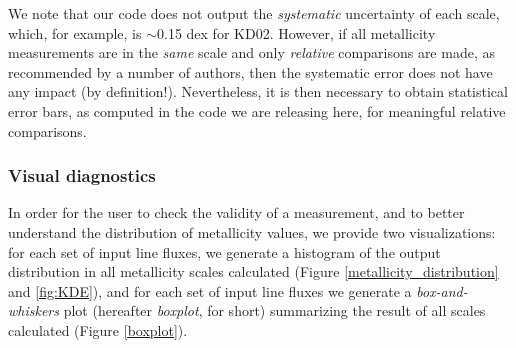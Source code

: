 \documentclass{emulateapj}
\begin{document}
We note that our code does not output the \emph{systematic} uncertainty of each scale, which, for example, is $\sim$0.15 \nolinebreak dex  for KD02. However, if all metallicity measurements are in the \emph{same} scale and only \emph{relative} comparisons are made, as recommended by a number of authors, then the systematic error does not have any impact (by definition!). Nevertheless, it is then necessary to obtain statistical error bars, as computed in the code we are releasing here, for meaningful relative comparisons.




\subsubsection{Visual diagnostics}\label{vizs}
In order for the user to check the validity of a measurement, and to better understand the distribution of metallicity values, we provide two visualizations: for each set of input line fluxes, we generate a histogram of the output distribution in all metallicity scales calculated (Figure \ref{metallicity_distribution} and \ref{fig:KDE}), and for each set of input line fluxes we generate a \emph{box-and-whiskers} plot (hereafter \emph{boxplot}, for short) summarizing the result of all scales calculated (Figure \ref{boxplot}). 
\end{document}
